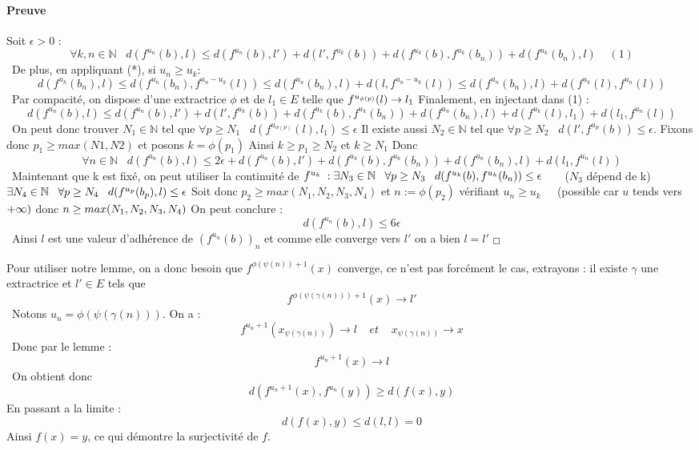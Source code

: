 \documentclass[letterpaper,10pt]{article}
\begin{document}
\paragraph{Preuve}
Soit $\epsilon > 0$ : \[\ 
   \forall k,n\in \mathbb{N} \;\;\; d(f^{u_n}(b),l) \leq d(f^{u_n}(b),l') + d(l',f^{u_k}(b))  + d(f^{u_k}(b),f^{u_k}(b_n))+d(f^{u_k}(b_n),l) \;\;\;\;(1)\]\ De plus, en appliquant (*), si $u_n \geq u_k$:  
\[\  d(f^{u_k}(b_n),l) \leq d(f^{u_n}(b_n),f^{u_n-u_k}(l)) \leq d(f^{u_n}(b_n),l) + d(l,f^{u_n-u_k}(l))  \leq d(f^{u_n}(b_n),l) + d(f^{u_k}(l),f^{u_n}(l)) \]\
Par compacité, on dispose d'une extractrice $\phi$ et de $l_1 \in E$ telle que $f^{u_{\phi(p)}}(l)  \rightarrow l_1 \\ $
Finalement, en injectant dans (1) : \[\ d(f^{u_n}(b),l) \leq d(f^{u_n}(b),l') + d(l',f^{u_k}(b))  + d(f^{u_k}(b),f^{u_k}(b_n))+ d(f^{u_n}(b_n),l) + d(f^{u_k}(l),l_1) + d(l_1,f^{u_n}(l)) \]\
On peut donc  trouver $N_1 \in \mathbb{N} $ tel que $\forall p \geq N_1 \;\;\;d(f^{u_{\phi(p)}}(l),l_1) \leq \epsilon $ Il existe aussi $N_2 \in \mathbb{N} $ tel que $\forall p \geq N_2 \;\;\;d(l',f^{u_p}(b)) \leq \epsilon$. Fixons donc $ p_1 \geq max(N1,N2) $ et posons $ k = \phi(p_1) $ Ainsi $k \geq p_1 \geq N_2 $ et $k\geq N_1$ Donc \[\ \forall n \in \mathbb{N}\;\;\; d(f^{u_n}(b),l) \leq 2\epsilon + d(f^{u_n}(b),l')   + d(f^{u_k}(b),f^{u_k}(b_n))+ d(f^{u_n}(b_n),l) +  d(l_1,f^{u_n}(l)) \]\ Maintenant que k est fixé, on peut utiliser la continuité de $f^{u_k} \; : \;\\ \exists N_3 \in \mathbb{N} \;\;\; \forall p \geq N_3\;\;\; d(f^{u_k}(b),f^{u_k}(b_n)) \leq \epsilon \;\;\;\;\;\;  $ ($N_3$ dépend de k)$
\\ \exists N_4 \in \mathbb{N} \;\;\; \forall p \geq N_4\;\;\; d(f^{u_p}(b_p),l) \leq \epsilon \\ \\$ Soit donc $p_2 \geq max(N_1,N_2,N_3,N_4)$ et $n := \phi(p_2)  $ vérifiant $u_n \geq u_k \;\;\;\; $ (possible car $u$ tends vers $+\infty) \\ $ donc $ n \geq max(N_1,N_2,N_3,N_4) \\ $ On peut conclure : \[\  d(f^{u_n}(b),l) \leq 6\epsilon\]\ Ainsi $l$ est une valeur d'adhérence de $(f^{u_n}(b))_n$ et comme elle converge vers $l'$ on a bien $l=l'$ $_\Box \\ \\$

Pour utiliser notre lemme, on a donc besoin que $f^{\phi(\psi(n))+1}(x)$ converge,
 ce n'est pas forcément le cas, extrayons : il existe $ \gamma $ une extractrice
  et $l' \in E$ tels que \[\ f^{\phi(\psi(\gamma(n)))+1}(x) \rightarrow l' \]\ 
  Notons $u_n = \phi(\psi(\gamma(n)))$. On a : \[\ f^{u_n+1}(x_{\psi(\gamma(n))})
   \rightarrow l \;\;\;\; et \;\;\;\; x_{\psi(\gamma(n))} \rightarrow x\]\ Donc par
    le lemme : \[\ f^{u_n+1}(x) \rightarrow l \]\ On obtient donc
     \[\ d(f^{u_n + 1}(x),f^{u_n}(y)) \geq d(f(x),y) \] En passant 
     a la limite : \[\ d(f(x),y) \leq d(l,l) = 0 \] Ainsi $f(x) = y $, 
     ce qui démontre la surjectivité de $f$.  \[\ \]
\end{document}
